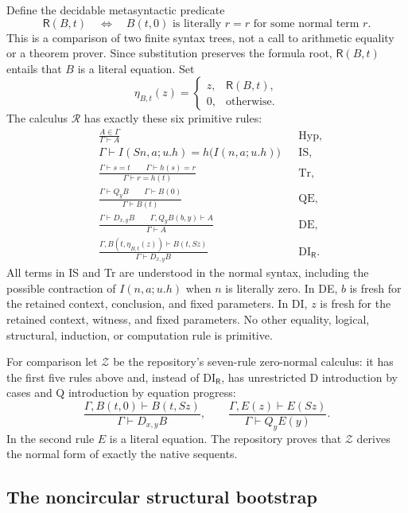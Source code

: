 \documentclass[11pt,a4paper]{article}
\theoremstyle{definition}
\begin{document}
Define the decidable metasyntactic predicate
\[
 \mathsf R(B,t)\quad\Longleftrightarrow\quad
 B(t,0)\text{ is literally }r=r\text{ for some normal term }r.
\]
This is a comparison of two finite syntax trees, not a call to arithmetic
equality or a theorem prover.  Since substitution preserves the formula
root, $\mathsf R(B,t)$ entails that $B$ is a literal equation.
Set
\[
 \eta_{B,t}(z)=
 \begin{cases}z,&\mathsf R(B,t),\\0,&\text{otherwise}.\end{cases}
\]
The calculus $\mathcal R$ has exactly these six primitive rules:
\begin{align*}
 &\frac{A\in\Gamma}{\Gamma\vdash A} &&\mathrm{Hyp},\\[3pt]
 &\Gamma\vdash
 I(Sn,a;u.h)=h\bigl(I(n,a;u.h)\bigr) &&\mathrm{IS},\\[3pt]
 &\frac{\Gamma\vdash s=t\qquad\Gamma\vdash h(s)=r}
        {\Gamma\vdash r=h(t)} &&\mathrm{Tr},\\[5pt]
 &\frac{\Gamma\vdash Q_yB\qquad\Gamma\vdash B(0)}
        {\Gamma\vdash B(t)} &&\mathrm{QE},\\[5pt]
 &\frac{\Gamma\vdash D_{x,y}B\qquad
         \Gamma,Q_yB(b,y)\vdash A}{\Gamma\vdash A} &&\mathrm{DE},\\[5pt]
 &\frac{\Gamma,B(t,\eta_{B,t}(z))\vdash B(t,Sz)}
        {\Gamma\vdash D_{x,y}B} &&\mathrm{DI}_{\mathsf R}.
\end{align*}
All terms in IS and Tr are understood in the normal syntax, including
the possible contraction of $I(n,a;u.h)$ when $n$ is literally zero.
In DE, $b$ is fresh for the retained context, conclusion, and fixed
parameters.  In DI, $z$ is fresh for the retained context, witness, and
fixed parameters.  No other equality, logical, structural, induction,
or computation rule is primitive.

For comparison let $\mathcal Z$ be the repository's seven-rule
zero-normal calculus: it has the first five rules above and, instead of
$\mathrm{DI}_{\mathsf R}$, has unrestricted D introduction by cases and
Q introduction by equation progress:
\[
 \frac{\Gamma,B(t,0)\vdash B(t,Sz)}{\Gamma\vdash D_{x,y}B},
 \qquad
 \frac{\Gamma,E(z)\vdash E(Sz)}{\Gamma\vdash Q_yE(y)}.
\]
In the second rule $E$ is a literal equation.  The repository proves
that $\mathcal Z$ derives the normal form of exactly the native sequents.

\subsection{The noncircular structural bootstrap}
\end{document}
